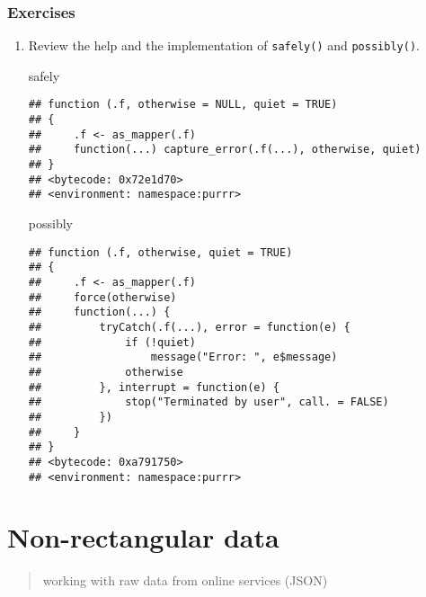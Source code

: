 \documentclass[]{book}
\newenvironment{Shaded}{\begin{snugshade}}{\end{snugshade}}
\newcommand{\NormalTok}[1]{#1}
\begin{document}
\hypertarget{exercises-19}{%
\subsection{Exercises}\label{exercises-19}}

\begin{enumerate}
\def\labelenumi{\arabic{enumi}.}
\item
  Review the help and the implementation of \texttt{safely()} and \texttt{possibly()}.

\begin{Shaded}
\begin{Highlighting}[]
\NormalTok{safely}
\end{Highlighting}
\end{Shaded}

\begin{verbatim}
## function (.f, otherwise = NULL, quiet = TRUE) 
## {
##     .f <- as_mapper(.f)
##     function(...) capture_error(.f(...), otherwise, quiet)
## }
## <bytecode: 0x72e1d70>
## <environment: namespace:purrr>
\end{verbatim}

\begin{Shaded}
\begin{Highlighting}[]
\NormalTok{possibly}
\end{Highlighting}
\end{Shaded}

\begin{verbatim}
## function (.f, otherwise, quiet = TRUE) 
## {
##     .f <- as_mapper(.f)
##     force(otherwise)
##     function(...) {
##         tryCatch(.f(...), error = function(e) {
##             if (!quiet) 
##                 message("Error: ", e$message)
##             otherwise
##         }, interrupt = function(e) {
##             stop("Terminated by user", call. = FALSE)
##         })
##     }
## }
## <bytecode: 0xa791750>
## <environment: namespace:purrr>
\end{verbatim}
\end{enumerate}

\hypertarget{non-rectangular-data}{%
\chapter{Non-rectangular data}\label{non-rectangular-data}}

\begin{quote}
working with raw data from online services (JSON)
\end{quote}
\end{document}
